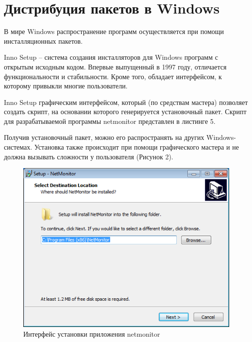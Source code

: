 \newpage
\section{Дистрибуция пакетов в Windows}

В мире Windows распространение программ осуществляется при помощи инсталляционных пакетов.

Inno Setup -- система создания инсталляторов для Windows программ с открытым исходным кодом. Впервые выпущенный в 1997 году, отличается функциональности и стабильности. Кроме того, обладает интерфейсом, к которому привыкли многие пользователи.

Inno Setup графическим интерфейсом, который (по средствам мастера) позволяет создать скрипт, на основании которого генерируется установочный пакет. Скрипт для разрабатываемой программы netmonitor представлен в листинге 5.



Получив установочный пакет, можно его распространять на других Windows-системах. Установка также происходит при помощи графического мастера и не должна вызывать сложности у пользователя (Рисунок 2).

\begin{figure}[H]
 \centering
 \includegraphics[scale=1]{res/pic002}
 \caption{Интерфейс установки приложения netmonitor}
\end{figure}